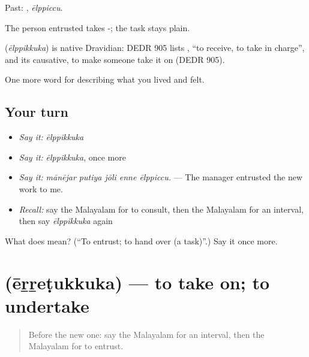 Past: , \emph{ēlppiccu}.

The person entrusted takes -; the task stays plain.

\begin{cousinweb}
\textbf{} (\emph{ēlppikkuka}) is native Dravidian: DEDR 905 lists , \textquotedblleft{}to receive, to take in charge\textquotedblright{}, and its causative, to make someone take it on (DEDR 905).
\end{cousinweb}

\begin{grammarlens}[title={What you've built}]
One more word for describing what you lived and felt.
\end{grammarlens}

\subsection*{Your turn}
\begin{itemize}
\raggedright
  \item \emph{Say it:} \emph{ēlppikkuka}
  \item \emph{Say it:} \emph{ēlppikkuka}, once more
  \item \emph{Say it:} \emph{mānējar putiya jōli enne ēlppiccu.} — The manager entrusted the new work to me.
  \item \emph{Recall:} say the Malayalam for to consult, then the Malayalam for an interval, then say \emph{ēlppikkuka} again
\end{itemize}

\begin{tcolorbox}[breakable,colback=teal!4,colframe=teal!35!black,title={Before you move on}]
What does  mean? (\textquotedblleft{}To entrust; to hand over (a task)\textquotedblright{}.) Say it once more.
\end{tcolorbox}
\section[\texorpdfstring{\ml{ഏറ്റെടുക്കുക} (ēṟṟeṭukkuka)}{ഏറ്റെടുക്കുക (ēṟṟeṭukkuka)}]{ (ēṟṟeṭukkuka) — to take on; to undertake}

\label{lesson:ML-C551-erretukkuka}



\begin{quote}
Before the new one: say the Malayalam for an interval, then the Malayalam for to entrust.
\end{quote}

